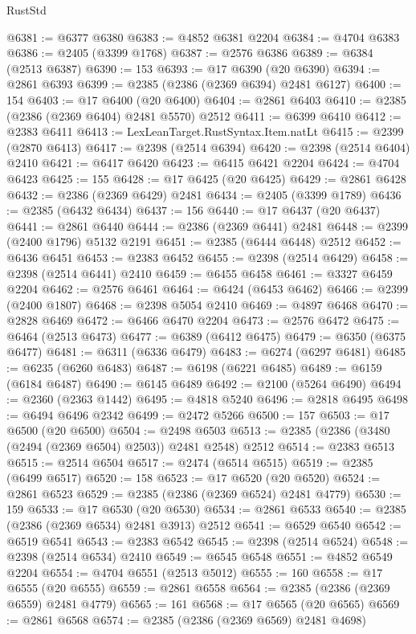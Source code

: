 \begin{lexlean}{RustStd}
\begin{coremodule}
@6381 := @6377 @6380
@6383 := @4852 @6381 @2204
@6384 := @4704 @6383
@6386 := @2405 (@3399 @1768)
@6387 := @2576 @6386
@6389 := @6384 (@2513 @6387)
@6390 := 153
@6393 := @17 @6390 (@20 @6390)
@6394 := @2861 @6393
@6399 := @2385 (@2386 (@2369 @6394) @2481 @6127)
@6400 := 154
@6403 := @17 @6400 (@20 @6400)
@6404 := @2861 @6403
@6410 := @2385 (@2386 (@2369 @6404) @2481 @5570) @2512
@6411 := @6399 @6410
@6412 := @2383 @6411
@6413 := LexLeanTarget.RustSyntax.Item.natLt
@6415 := @2399 (@2870 @6413)
@6417 := @2398 (@2514 @6394)
@6420 := @2398 (@2514 @6404) @2410
@6421 := @6417 @6420
@6423 := @6415 @6421 @2204
@6424 := @4704 @6423
@6425 := 155
@6428 := @17 @6425 (@20 @6425)
@6429 := @2861 @6428
@6432 := @2386 (@2369 @6429) @2481
@6434 := @2405 (@3399 @1789)
@6436 := @2385 (@6432 @6434)
@6437 := 156
@6440 := @17 @6437 (@20 @6437)
@6441 := @2861 @6440
@6444 := @2386 (@2369 @6441) @2481
@6448 := @2399 (@2400 @1796) @5132 @2191
@6451 := @2385 (@6444 @6448) @2512
@6452 := @6436 @6451
@6453 := @2383 @6452
@6455 := @2398 (@2514 @6429)
@6458 := @2398 (@2514 @6441) @2410
@6459 := @6455 @6458
@6461 := @3327 @6459 @2204
@6462 := @2576 @6461
@6464 := @6424 (@6453 @6462)
@6466 := @2399 (@2400 @1807)
@6468 := @2398 @5054 @2410
@6469 := @4897 @6468
@6470 := @2828 @6469
@6472 := @6466 @6470 @2204
@6473 := @2576 @6472
@6475 := @6464 (@2513 @6473)
@6477 := @6389 (@6412 @6475)
@6479 := @6350 (@6375 @6477)
@6481 := @6311 (@6336 @6479)
@6483 := @6274 (@6297 @6481)
@6485 := @6235 (@6260 @6483)
@6487 := @6198 (@6221 @6485)
@6489 := @6159 (@6184 @6487)
@6490 := @6145 @6489
@6492 := @2100 (@5264 @6490)
@6494 := @2360 (@2363 @1442)
@6495 := @4818 @5240
@6496 := @2818 @6495
@6498 := @6494 @6496 @2342
@6499 := @2472 @5266
@6500 := 157
@6503 := @17 @6500 (@20 @6500)
@6504 := @2498 @6503
@6513 := @2385 (@2386 (@3480 (@2494 (@2369 @6504) @2503)) @2481 @2548) @2512
@6514 := @2383 @6513
@6515 := @2514 @6504
@6517 := @2474 (@6514 @6515)
@6519 := @2385 (@6499 @6517)
@6520 := 158
@6523 := @17 @6520 (@20 @6520)
@6524 := @2861 @6523
@6529 := @2385 (@2386 (@2369 @6524) @2481 @4779)
@6530 := 159
@6533 := @17 @6530 (@20 @6530)
@6534 := @2861 @6533
@6540 := @2385 (@2386 (@2369 @6534) @2481 @3913) @2512
@6541 := @6529 @6540
@6542 := @6519 @6541
@6543 := @2383 @6542
@6545 := @2398 (@2514 @6524)
@6548 := @2398 (@2514 @6534) @2410
@6549 := @6545 @6548
@6551 := @4852 @6549 @2204
@6554 := @4704 @6551 (@2513 @5012)
@6555 := 160
@6558 := @17 @6555 (@20 @6555)
@6559 := @2861 @6558
@6564 := @2385 (@2386 (@2369 @6559) @2481 @4779)
@6565 := 161
@6568 := @17 @6565 (@20 @6565)
@6569 := @2861 @6568
@6574 := @2385 (@2386 (@2369 @6569) @2481 @4698)

\end{coremodule}
\end{lexlean}
